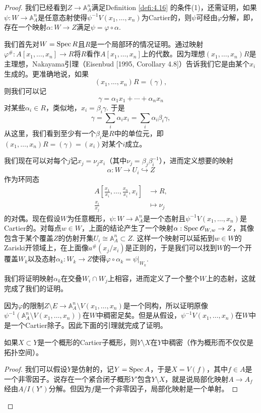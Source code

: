 \begin{proof}
	我们已经看到$Z\to \mathbb A_A^n$满足Definition \ref{defi:4.16} 的条件(1)，还需证明，如果$\psi:W\to \mathbb A_A^n$是任意态射使得$\psi^{-1}V(x_1,\dots,x_n)$为Cartier的，则$\psi$可经由$\varphi$分解，即，存在一个映射$\alpha:W\to Z$满足$\psi=\varphi\circ\alpha$.

	我们首先对$W=\operatorname{Spec} R$且$R$是一个局部环的情况证明。通过映射$\varphi^\#:A[x_1,\dots,x_n]\to R$将$R$看作$A[x_1,\dots,x_n]$上的代数。因为理想$(x_1,\dots,x_n)R$是主理想，Nakayama引理（Eisenbud [1995, Corollary 4.8]）告诉我们它是由某个$x_i$生成的。更准确地说，如果
	\[
		(x_1,\dots,x_n)R=(\gamma),
	\]
	则我们可以记
	\[
		\gamma=\alpha_1 x_1+\cdots +\alpha_n x_n
	\]
	对某些$\alpha_i\in R$，类似地，$x_i=\beta_i\gamma$. 于是
	\[
		\gamma=\sum_i \alpha_i x_i=\sum_i \alpha_i \beta_i \gamma,
	\]
	从这里，我们看到至少有一个$\beta_i$是$R$中的单位元，即$(x_1,\dots,x_n)R=(\gamma)=(x_i)$对某个$i$成立。

	我们现在可以对每个$j$记$x_j=\nu_j x_i$（其中$\nu_j=\beta_j\beta_i^{-1}$），进而定义想要的映射
	\[
		\alpha:W\to U_i\hookrightarrow Z
	\]
	作为环同态
	\[
	\begin{aligned}
		A\left[\frac{x_1}{x_i},\dots,\frac{x_n}{x_i},x_i\right] & \longrightarrow R,\\
		\frac{x_i}{x_j}&\longmapsto \nu_j
	\end{aligned}
	\]
	的对偶。现在假设$W$为任意概形，$\psi:W\to \mathbb A_A^n$是一个态射且$\psi^{-1}V(x_1,\dots,x_n)$是Cartier的。对每点$w\in W$，上面的结论产生了一个映射$\alpha:\operatorname{Spec} \mathscr O_{W,w}\to Z$，其像包含于某个覆盖$Z$的仿射开集$U_i\cong \mathbb A_A^n\subset Z$. 这样一个映射可以延拓到$w\in W$的Zariski开领域上，在上面像$a^\#(x_j/x_i)$是正则的，于是我们可以找到$W$的一个开覆盖$W_k$以及态射$\alpha_k:W_k\to Z$使得$\varphi\circ \alpha_k=\psi|_{W_k}$.

	我们将证明映射$\alpha_k$在交叠$W_i\cap W_j$上相容，进而定义了一个整个$W$上的态射，这就完成了我们的证明。

	因为$\varphi$的限制$Z\setminus E\to \mathbb A_A^n\setminus V(x_1,\dots,x_n)$是一个同构，所以证明原像$\psi^{-1}(\mathbb A_A^n\setminus V(x_1,\dots,x_n))$在$W$中稠密足矣。但是从假设，$\psi^{-1}V(x_1,\dots,x_n)$在$W$中是一个Cartier除子。因此下面的引理就完成了证明。

	\begin{lem}\label{lem:4.19}
		如果$X\subset Y$是一个概形的Cartier子概形，则$Y\setminus X$在$Y$中稠密（作为概形而不仅仅是拓扑空间）。
	\end{lem}

	\begin{proof}
		我们可以假设$Y$是仿射的，记$Y=\operatorname{Spec} A$，于是$X=V(f)$，其中$f\in A$是一个非零因子。说存在一个紧合闭子概形$Y'$包含$Y\setminus X$，就是说局部化映射$A\to A_f$经由$A/I(Y')$分解。但因为$f$是一个非零因子，局部化映射是一个单射。
	\end{proof}
	\let\qed\relax
\end{proof}


